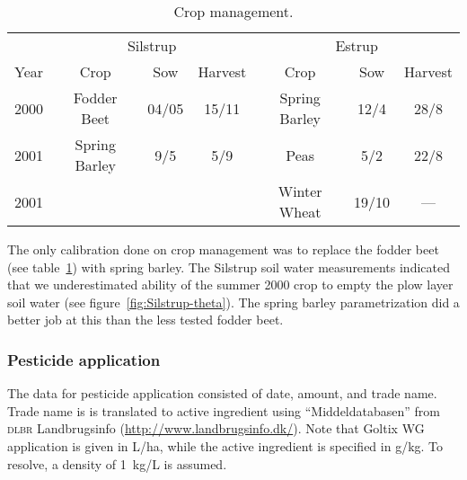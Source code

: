 \documentclass[a4paper]{article}
\begin{document}
\begin{text}
\begin{table}[htbp]
  \caption{Crop management.}
  \label{tab:crop-man}
  \centering
  \begin{tabular}{c||c|c|c||c|c|c}\hline
    & \multicolumn{3}{c||}{Silstrup} & \multicolumn{3}{c}{Estrup}\\
    Year & Crop          & Sow   & Harvest & Crop          & Sow   & Harvest\\
\hline
    2000 & Fodder Beet   & 04/05 & 15/11   & Spring Barley & 12/4  & 28/8 \\
    2001 & Spring Barley & 9/5   & 5/9     & Peas          & 5/2   & 22/8 \\
    2001 &               &       &         & Winter Wheat  & 19/10 & --- \\
  \end{tabular}
\end{table}

The only calibration done on crop management was to replace the fodder
beet (see table~\ref{tab:crop-man}) with spring barley.  The Silstrup
soil water measurements indicated that we underestimated ability of
the summer 2000 crop to empty the plow layer soil water (see
figure~\ref{fig:Silstrup-theta}).  The spring barley parametrization
did a better job at this than the less tested fodder beet.

\subsubsection{Pesticide application}

The data for pesticide application consisted of date, amount, and
trade name.  Trade name is is translated to active ingredient using
``Middeldatabasen'' from \textsc{dlbr} Landbrugsinfo
(\url{http://www.landbrugsinfo.dk/}).  Note that Goltix WG application
is given in L/ha, while the active ingredient is specified in g/kg.
To resolve, a density of 1~kg/L is assumed. 


\end{text}
\end{document}

